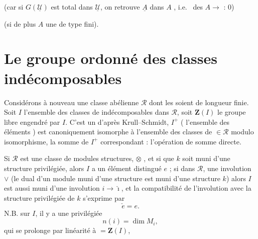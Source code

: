 \documentclass[11pt,a4paper]{article}
\begin{document}
 (car si $G(\underline{\mathcal{U}})$
 est total dans $\underline{\mathcal{U}}$, on retrouve
$\underline{A}$ dans $A$ \struck{\ill{}}, i.e.\ \ill{} \ill{} des \ill{} \ill{}
$A \to$ \ill{} : 0)

 (si de plus $A$ \ill{} une \ill{} \ill{} de type
fini).

\section*{Le groupe ordonné des classes indécomposables}


Considérons à nouveau une classe abélienne $\mathcal{R}$ dont les \ill{} soient
de longueur finie. Soit $I$ l'ensemble des classes de \ill{} indécomposables
dans $\mathcal{R}$, soit $\mathbf{Z}(I)$ le groupe libre engendré par $I$. C'est
un  d'après Krull--Schmidt, $I^{+}$ ( l'ensemble des
éléments \ill{} ) est canoniquement isomorphe à l'ensemble des classes de \ill{}
$\in \mathcal{R}$ modulo isomorphisme, la somme de $I^{+}$ correspondant :
l'opération de somme directe.

Si $\mathcal{R}$ est une classe de \struck{\ill{}} \add{\ill{}} modules
\struck{\ill{}} \ill{} structures, $\otimes$ \ill{}, et si \ill{} que $k$ soit
muni d'une structure privilégiée, alors $I$ a un élément distingué $e$ ; si dans
$\mathcal{R}$, \ill{} une involution $\vee$ (le dual d'un module muni d'une
structure \ill{} est muni d'une structure \ill{} $k$) alors $I$ est aussi muni
d'une involution $i \to \check{\imath}$, et la compatibilité de l'involution
avec la structure privilégiée de $k$ s'exprime par
\[ \check{e} = e . \]
N.B. \ill{} sur $I$, il y a une \ill{} \ill{} privilégiée
\[ n(i) = \dim M_{i} , \]
qui se prolonge par linéarité à \ill{} $= \mathbf{Z}(I)$,

\end{document}
